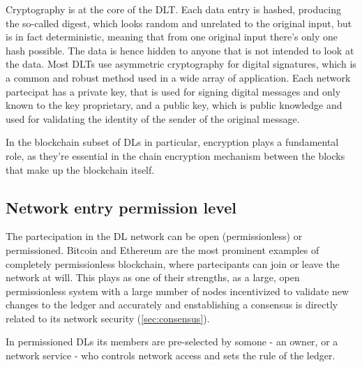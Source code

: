 Cryptography is at the core of the DLT. Each data entry is hashed, producing the so-called digest, which looks random and unrelated to the original input, but is in fact deterministic, meaning that from one original input there's only one hash possible. The data is hence hidden to anyone that is not intended to look at the data. Most DLTs use asymmetric cryptography for digital signatures, which is a common and robust method used in a wide array of application. Each network partecipat has a private key, that is used for signing digital messages and only known to the key proprietary, and a public key, which is public knowledge and used for validating the identity of the sender of the original message.

In the blockchain subset of DLs in particular, encryption plays a fundamental role, as they're essential in the chain encryption mechanism between the blocks that make up the blockchain itself.

\subsection{Network entry permission level}

The partecipation in the DL network can be open (permissionless) or permissioned. Bitcoin and Ethereum are the most prominent examples of completely permissionless blockchain, where partecipants can join or leave the network at will. This plays as one of their strengths, as a large, open permissionless system with a large number of nodes incentivized to validate new changes to the ledger and accurately and enstablishing a consensus is directly related to its network security (\ref{sec:consensus}).

In permissioned DLs its members are pre-selected by somone - an owner, or a network service - who controls network access and sets the rule of the ledger. 



